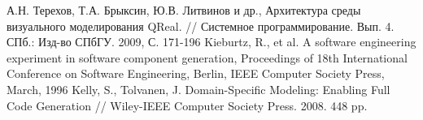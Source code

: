 \documentclass[a4paper]{article}
\begin{document}
\begin{thebibliography}{9001}
   А.Н. Терехов, Т.А. Брыксин, Ю.В. Литвинов и др., Архитектура среды визуального моделирования QReal. // Системное программирование. Вып. 4. СПб.: Изд-во СПбГУ. 2009, С. 171-196
	 Kieburtz, R., et al. A software engineering experiment in software component generation, Proceedings of 18th International Conference on Software Engineering, Berlin, IEEE Computer Society Press, March, 1996
   Kelly, S., Tolvanen, J. Domain-Specific Modeling: Enabling Full Code Generation // Wiley-IEEE Computer Society Press. 2008. 448 pp.
\end{thebibliography}
\end{document}

